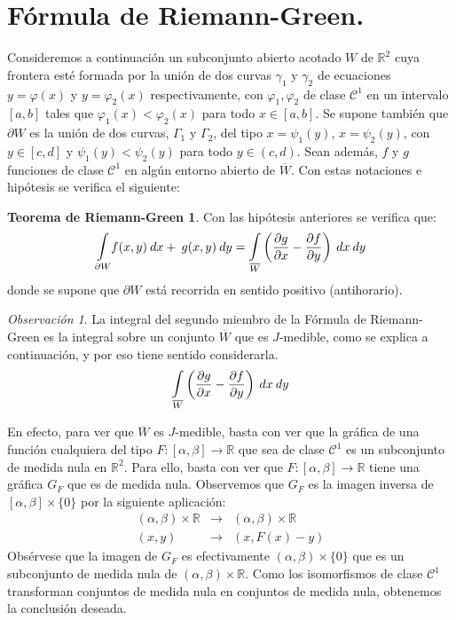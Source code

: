 \documentclass[12pt,twoside]{report}
\newcommand\mc[1]{\mathcal{#1}}
\theoremstyle{azul}
\theoremstyle{azul2}
\theoremstyle{plain}
\theoremstyle{definition}
\newtheorem*{theogreen}{Teorema de Riemann-Green}
\theoremstyle{remark}
\newtheorem*{obs}{Observación}
\begin{document}
\section{Fórmula de Riemann-Green.}
Consideremos a continuación un subconjunto abierto acotado $W$ de $\mathbb{R}^2$ cuya frontera esté formada por la unión de dos curvas $\gamma_1$ y $\gamma_2$ de ecuaciones $y=\varphi(x)$ y $y=\varphi_2(x)$ respectivamente, con $\varphi_1, \varphi_2$ de clase $\mathcal{C}^1$ en un intervalo $[a,b]$ tales que $\varphi_1(x)<\varphi_2(x)$ para todo $x\in[a,b]$. Se supone también que $\partial W$ es la unión de dos curvas, $\Gamma_1$ y $\Gamma_2$, del tipo $x=\psi_1(y)$, $x=\psi_2(y)$, con $y\in[c,d]$ y $\psi_1(y)<\psi_2(y)$ para todo $y\in(c,d)$. Sean además, $f$ y $g$ funciones de clase $\mathcal{C}^1$ en algún entorno abierto de $\overline{W}$. Con estas notaciones e hipótesis se verifica el siguiente:
\begin{theogreen}
Con las hipótesis anteriores se verifica que: 
$$\underset{{\partial W}}{\mathlarger{\int}} f(x,y) \: dx + \: g(x,y) \: dy = \underset{{\overline{W}}}{\mathlarger{\int}} \left( \dfrac{\partial g}{\partial x} - \dfrac{\partial f}{\partial y}\right) \: dx \: dy$$
donde se supone que $\partial W$ está recorrida en sentido positivo (antihorario).
\end{theogreen}
\begin{obs} La integral del segundo miembro de la Fórmula de Riemann-Green es la integral sobre un conjunto $\overline{W}$ que es $J$-medible, como se explica a continuación, y por eso tiene sentido considerarla. 
$$\underset{{\overline{W}}}{\mathlarger{\int}} \left( \dfrac{\partial g}{\partial x} - \dfrac{\partial f}{\partial y}\right) \: dx \: dy$$ 

En efecto, para ver que  $\overline{W}$ es $J$-medible, basta con ver que la gráfica de una función cualquiera del tipo $F: [\alpha, \beta] \longrightarrow \mathbb{R}$ que sea de clase $\mc{C}^1$ es un subconjunto de medida nula en $\mathbb{R}^2$. Para ello, basta con ver que $F:[\alpha, \beta] \longrightarrow \mathbb{R} $ tiene una gráfica $G_F$ que es de medida nula. Observemos que $G_F$ es la imagen inversa de $[\alpha, \beta] \times \{0\}$ por la siguiente aplicación:
$$\begin{array}{rcl}
     (\alpha, \beta) \times \mathbb{R} & \longrightarrow & (\alpha, \beta) \times \mathbb{R}  \\
     (x,y) & \longrightarrow & (x,F(x)-y) 
\end{array}$$
Obsérvese que la imagen de $G_F$ es efectivamente $(\alpha, \beta) \times \{0\}$ que es un subconjunto de medida nula de $(\alpha, \beta) \times \mathbb{R}$. Como los isomorfismos de clase $\mc{C}^1$ transforman conjuntos de medida nula en conjuntos de medida nula, obtenemos la conclusión deseada. 
\end{obs}
\end{document}
